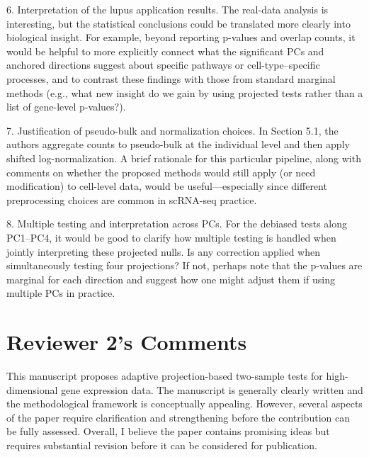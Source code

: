 \documentclass{article}
\theoremstyle{definition}
\begin{document}
\begin{shaded}
6. Interpretation of the lupus application results.
The real-data analysis is interesting, but the statistical conclusions could be translated more clearly into biological insight. For example, beyond reporting p-values and overlap counts, it would be helpful to more explicitly connect what the significant PCs and anchored directions suggest about specific pathways or cell-type–specific processes, and to contrast these findings with those from standard marginal methods (e.g., what new insight do we gain by using projected tests rather than a list of gene-level p-values?).
\end{shaded}

\begin{shaded}
7. Justification of pseudo-bulk and normalization choices.
In Section 5.1, the authors aggregate counts to pseudo-bulk at the individual level and then apply shifted log-normalization. A brief rationale for this particular pipeline, along with comments on whether the proposed methods would still apply (or need modification) to cell-level data, would be useful—especially since different preprocessing choices are common in scRNA-seq practice.
\end{shaded}

\begin{shaded}
8. Multiple testing and interpretation across PCs.
For the debiased tests along PC1–PC4, it would be good to clarify how multiple testing is handled when jointly interpreting these projected nulls. Is any correction applied when simultaneously testing four projections? If not, perhaps note that the p-values are marginal for each direction and suggest how one might adjust them if using multiple PCs in practice.
\end{shaded}

\newpage
\section{Reviewer 2's Comments}

\begin{shaded}
    This manuscript proposes adaptive projection-based two-sample tests for high-dimensional gene expression data.  The manuscript is generally clearly written and the methodological framework is conceptually appealing. However, several aspects of the paper require clarification and strengthening before the contribution can be fully assessed. Overall, I believe the paper contains promising ideas but requires substantial revision before it can be considered for publication.
\end{shaded}
\end{document}
